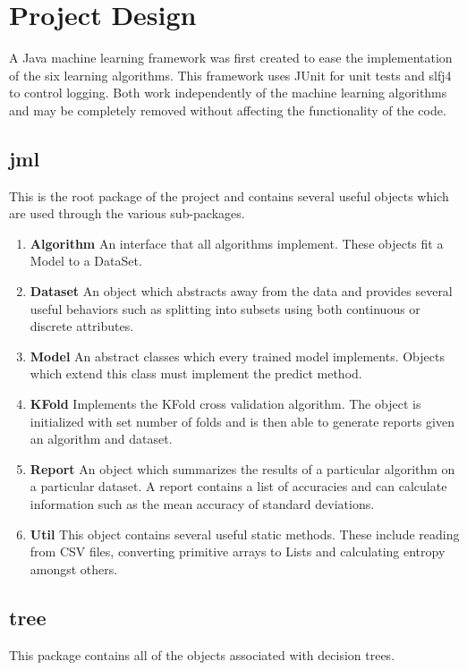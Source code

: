 \documentclass[11pt]{article}
\newcommand{\bb}{\textbf}
\begin{document}
\section{Project Design}
A Java machine learning framework was first created to ease the implementation of the six learning algorithms. This framework uses JUnit for unit tests and slfj4 to control logging. Both work independently of the machine learning algorithms and may be completely removed without affecting the functionality of the code.

\subsection{jml}
This is the root package of the project and contains several useful objects which are used through the various sub-packages.

\begin{enumerate}[leftmargin=*]
  \item[] \bb{Algorithm} An interface that all algorithms implement. These objects fit a Model to a DataSet.
  \item[] \bb{Dataset} An object which abstracts away from the data and provides several useful behaviors such as splitting into subsets using both continuous or discrete attributes.
  \item[] \bb{Model} An abstract classes which every trained model implements. Objects which extend this class must implement the predict method.
  \item[] \bb{KFold} Implements the KFold cross validation algorithm. The object is initialized with set number of folds and is then able to generate reports given an algorithm and dataset.
  \item[] \bb{Report} An object which summarizes the results of a particular algorithm on a particular dataset. A report contains a list of accuracies and can calculate information such as the mean accuracy of standard deviations.
  \item[] \bb{Util} This object contains several useful static methods. These include reading from CSV files, converting primitive arrays to Lists and calculating entropy amongst others.
\end{enumerate}

\subsection{tree}
This package contains all of the objects associated with decision trees.
\end{document}
